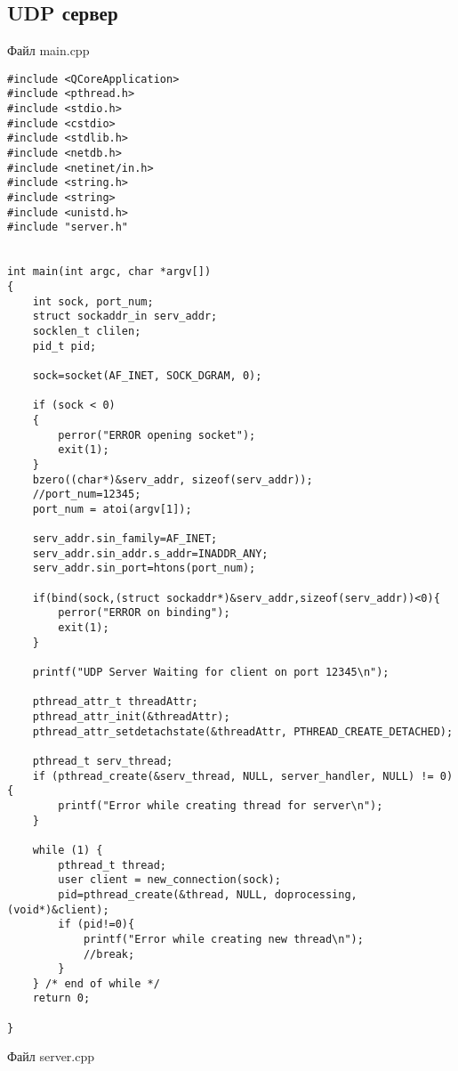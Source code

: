 \documentclass[12pt,a4paper]{report}
\begin{document}
\subsection*{UDP сервер}
Файл main.cpp
\begin{lstlisting}
#include <QCoreApplication>
#include <pthread.h>
#include <stdio.h>
#include <cstdio>
#include <stdlib.h>
#include <netdb.h>
#include <netinet/in.h>
#include <string.h>
#include <string>
#include <unistd.h>
#include "server.h"


int main(int argc, char *argv[])
{
    int sock, port_num;
    struct sockaddr_in serv_addr;
    socklen_t clilen;
    pid_t pid;

    sock=socket(AF_INET, SOCK_DGRAM, 0);

    if (sock < 0)
    {
        perror("ERROR opening socket");
        exit(1);
    }
    bzero((char*)&serv_addr, sizeof(serv_addr));
    //port_num=12345;
    port_num = atoi(argv[1]);

    serv_addr.sin_family=AF_INET;
    serv_addr.sin_addr.s_addr=INADDR_ANY;
    serv_addr.sin_port=htons(port_num);

    if(bind(sock,(struct sockaddr*)&serv_addr,sizeof(serv_addr))<0){
        perror("ERROR on binding");
        exit(1);
    }

    printf("UDP Server Waiting for client on port 12345\n");
    
    pthread_attr_t threadAttr;
    pthread_attr_init(&threadAttr);
    pthread_attr_setdetachstate(&threadAttr, PTHREAD_CREATE_DETACHED);

    pthread_t serv_thread;
    if (pthread_create(&serv_thread, NULL, server_handler, NULL) != 0) {
        printf("Error while creating thread for server\n");
    }

    while (1) {
        pthread_t thread;
        user client = new_connection(sock);
        pid=pthread_create(&thread, NULL, doprocessing, (void*)&client);
        if (pid!=0){
            printf("Error while creating new thread\n");
            //break;
        }
    } /* end of while */
    return 0;

}
\end{lstlisting}
Файл server.cpp
\end{document}
